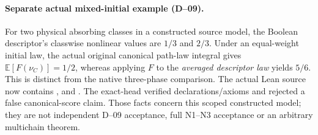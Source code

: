 \paragraph{Separate actual mixed-initial example (D--09).}
For two physical absorbing classes in a constructed source model,
the Boolean descriptor's classwise nonlinear values are $1/3$ and
$2/3$. Under an equal-weight initial law, the actual original
canonical path-law integral gives $\mathbb E[F(\nu_C)]=1/2$,
whereas applying $F$ to the \emph{averaged descriptor law} yields
$5/6$. This is distinct from the native three-phase comparison.
The actual Lean source now contains
,
 and
. The exact-head
 verified declarations/axioms and
rejected a false canonical-score claim. Those facts concern this
scoped constructed model; they are not independent D--09 acceptance,
full N1--N3 acceptance or an arbitrary multichain theorem.
